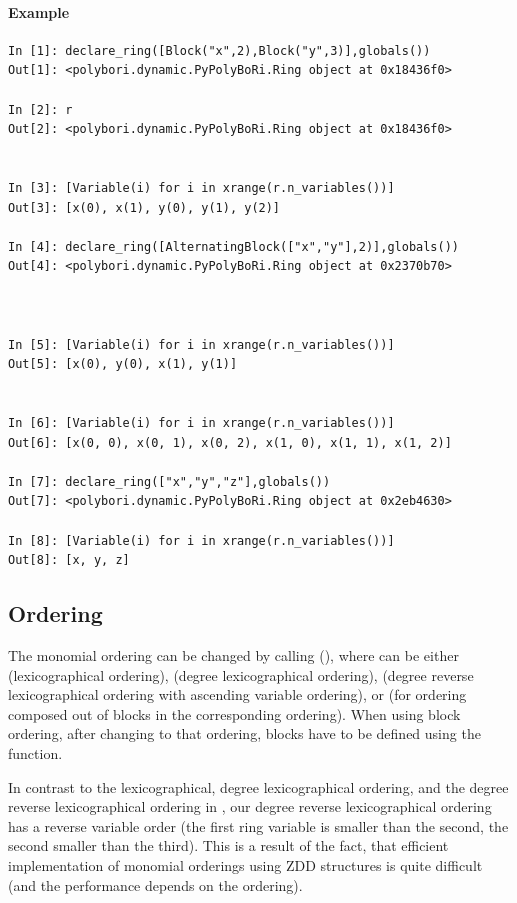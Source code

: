\paragraph{Example}
\begin{lstlisting}
In [1]: declare_ring([Block("x",2),Block("y",3)],globals())
Out[1]: <polybori.dynamic.PyPolyBoRi.Ring object at 0x18436f0>

In [2]: r
Out[2]: <polybori.dynamic.PyPolyBoRi.Ring object at 0x18436f0>


In [3]: [Variable(i) for i in xrange(r.n_variables())]
Out[3]: [x(0), x(1), y(0), y(1), y(2)]

In [4]: declare_ring([AlternatingBlock(["x","y"],2)],globals())
Out[4]: <polybori.dynamic.PyPolyBoRi.Ring object at 0x2370b70>



In [5]: [Variable(i) for i in xrange(r.n_variables())]
Out[5]: [x(0), y(0), x(1), y(1)]


In [6]: [Variable(i) for i in xrange(r.n_variables())]
Out[6]: [x(0, 0), x(0, 1), x(0, 2), x(1, 0), x(1, 1), x(1, 2)]

In [7]: declare_ring(["x","y","z"],globals())
Out[7]: <polybori.dynamic.PyPolyBoRi.Ring object at 0x2eb4630>

In [8]: [Variable(i) for i in xrange(r.n_variables())]
Out[8]: [x, y, z]  
\end{lstlisting}



\subsection{Ordering}
The monomial ordering can be changed by calling
(), where  can be either  (lexicographical ordering),  (degree lexicographical ordering),  (degree reverse lexicographical ordering with ascending variable ordering),  or  (for ordering composed out of blocks in the corresponding ordering). When using block ordering, after changing to that ordering, blocks have to be defined using the  function.

In contrast to the lexicographical, degree lexicographical ordering, and the degree reverse lexicographical ordering in \Singular, our degree reverse lexicographical ordering has a reverse variable order (the first ring variable is smaller than the second, the second smaller than the third). This is a result of the fact, that efficient implementation of monomial orderings using ZDD structures is quite difficult (and the performance depends on the ordering).
